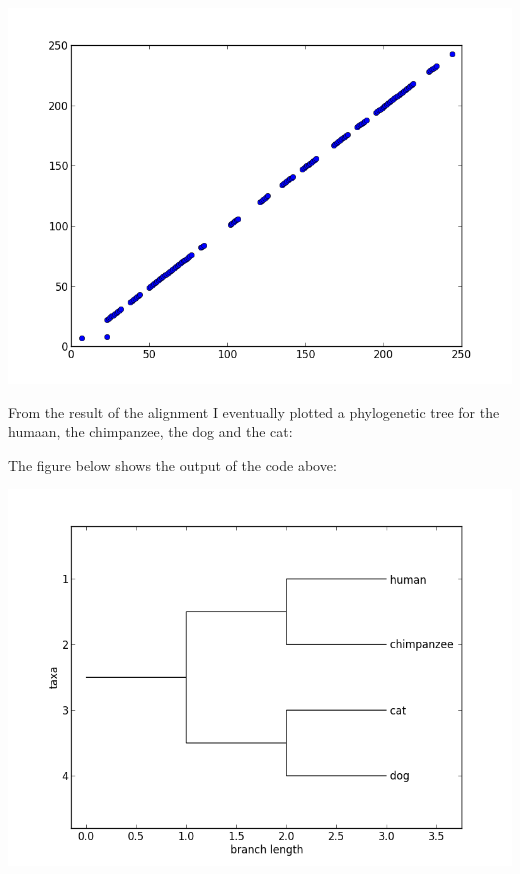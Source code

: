 \documentclass[%
]
{scrartcl}
\theoremstyle{plain}
\begin{document}
\begin{center}
\centering
\includegraphics[width=0.6\linewidth]{../DogCatAlignment.png}
\end{center}

From the result of the alignment I eventually plotted a phylogenetic tree for the humaan, the chimpanzee, the dog and the cat:



The figure below shows the output of the code above:

\begin{center}
\centering
\includegraphics[width=0.6\linewidth]{../PhylogeneticTree.png}
\end{center}

%
\end{document}

